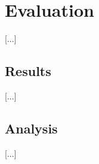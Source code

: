 \section{Evaluation}
\label{evaluation}

[...]

\subsection{Results}

[...]

\subsection{Analysis}

[...]
